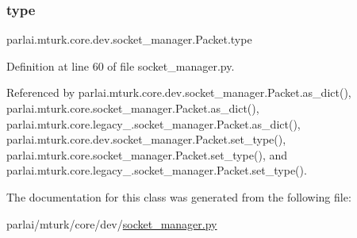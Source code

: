 \subsubsection{\texorpdfstring{type}{type}}
{\footnotesize\ttfamily parlai.\+mturk.\+core.\+dev.\+socket\+\_\+manager.\+Packet.\+type}



Definition at line 60 of file socket\+\_\+manager.\+py.



Referenced by parlai.\+mturk.\+core.\+dev.\+socket\+\_\+manager.\+Packet.\+as\+\_\+dict(), parlai.\+mturk.\+core.\+socket\+\_\+manager.\+Packet.\+as\+\_\+dict(), parlai.\+mturk.\+core.\+legacy\+\_.\+socket\+\_\+manager.\+Packet.\+as\+\_\+dict(), parlai.\+mturk.\+core.\+dev.\+socket\+\_\+manager.\+Packet.\+set\+\_\+type(), parlai.\+mturk.\+core.\+socket\+\_\+manager.\+Packet.\+set\+\_\+type(), and parlai.\+mturk.\+core.\+legacy\+\_.\+socket\+\_\+manager.\+Packet.\+set\+\_\+type().



The documentation for this class was generated from the following file\+:\begin{DoxyCompactItemize}
\item 
parlai/mturk/core/dev/\hyperlink{dev_2socket__manager_8py}{socket\+\_\+manager.\+py}\end{DoxyCompactItemize}
